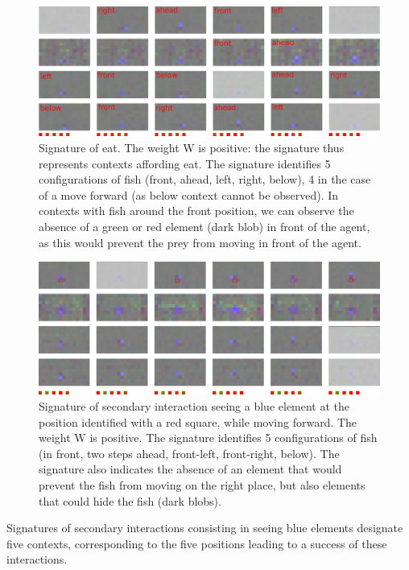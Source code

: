 \documentclass[conference]{IEEEtran}
\begin{document}
\begin{figure}[htbp]
\centerline{\includegraphics[scale=0.35]{img/sig_eat.pdf}}
\caption{Signature of eat. The weight W is positive: the signature thus represents contexts affording eat. The signature identifies 5 configurations of fish (front, ahead, left, right, below), 4 in the case of a move forward (as below context cannot be observed). In contexts with fish around the front position, we can observe the absence of a green or red element (dark blob) in front of the agent, as this would prevent the prey from moving in front of the agent.}
\label{fig}
\end{figure}

\begin{figure}[htbp]
\centerline{\includegraphics[scale=0.35]{img/sig_blue.pdf}}
\caption{Signature of secondary interaction seeing a blue element at the position identified with a red square, while moving forward. The weight W is positive. The signature identifies 5 configurations of fish (in front, two steps ahead, front-left, front-right, below). The signature also indicates the absence of an element that would prevent the fish from moving on the right place, but also elements that could hide the fish (dark blobs).}
\label{fig:sigblue}
\end{figure}

Signatures of secondary interactions consisting in seeing blue elements designate five contexts, corresponding to the five positions leading to a success of these interactions.
\end{document}
